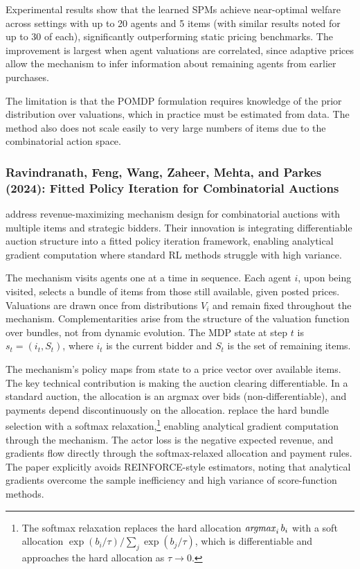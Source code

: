 Experimental results show that the learned SPMs achieve near-optimal welfare across settings with up to 20 agents and 5 items (with similar results noted for up to 30 of each), significantly outperforming static pricing benchmarks. The improvement is largest when agent valuations are correlated, since adaptive prices allow the mechanism to infer information about remaining agents from earlier purchases.

The limitation is that the POMDP formulation requires knowledge of the prior distribution over valuations, which in practice must be estimated from data. The method also does not scale easily to very large numbers of items due to the combinatorial action space.


\subsubsection{Ravindranath, Feng, Wang, Zaheer, Mehta, and Parkes (2024): Fitted Policy Iteration for Combinatorial Auctions}

\citet{RavindranathEtAl2024} address revenue-maximizing mechanism design for combinatorial auctions with multiple items and strategic bidders. Their innovation is integrating differentiable auction structure into a fitted policy iteration framework, enabling analytical gradient computation where standard RL methods struggle with high variance.

The mechanism visits agents one at a time in sequence. Each agent $i$, upon being visited, selects a bundle of items from those still available, given posted prices. Valuations are drawn once from distributions $V_i$ and remain fixed throughout the mechanism. Complementarities arise from the structure of the valuation function over bundles, not from dynamic evolution. The MDP state at step $t$ is $s_t = (i_t, S_t)$, where $i_t$ is the current bidder and $S_t$ is the set of remaining items.

The mechanism's policy maps from state to a price vector over available items. The key technical contribution is making the auction clearing differentiable. In a standard auction, the allocation is an argmax over bids (non-differentiable), and payments depend discontinuously on the allocation. \citet{RavindranathEtAl2024} replace the hard bundle selection with a softmax relaxation,\footnote{The softmax relaxation replaces the hard allocation $\mathop{\it argmax}_i b_i$ with a soft allocation $\exp(b_i/\tau)/\sum_j \exp(b_j/\tau)$, which is differentiable and approaches the hard allocation as $\tau \to 0$.} enabling analytical gradient computation through the mechanism. The actor loss is the negative expected revenue, and gradients flow directly through the softmax-relaxed allocation and payment rules. The paper explicitly avoids REINFORCE-style estimators, noting that analytical gradients overcome the sample inefficiency and high variance of score-function methods.


